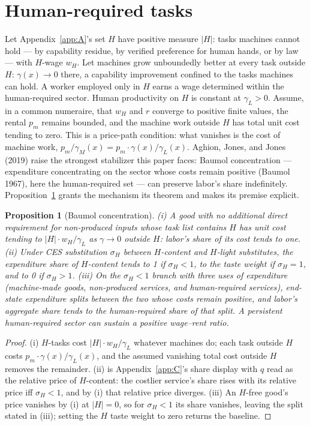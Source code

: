 \documentclass[12pt]{article}
\theoremstyle{plain}
\newtheorem{proposition}{Proposition}
\begin{document}
\section{Human-required tasks}\label{app:E}

Let Appendix~\ref{app:A}'s set $H$ have positive measure $|H|$: tasks machines cannot hold --- by capability residue, by verified preference for human hands, or by law --- with $H$-wage $w_H$. Let machines grow unboundedly better at every task outside $H$: $\gamma (x) \to 0$ there, a capability improvement confined to the tasks machines can hold. A worker employed only in $H$ earns a wage determined within the human-required sector. Human productivity on $H$ is constant at $\gamma_L>0$. Assume, in a common numeraire, that $w_H$ and $r$ converge to positive finite values, the rental $p_m$ remains bounded, and the machine work outside $H$ has total unit cost tending to zero. This is a price-path condition: what vanishes is the cost of machine work, $p_m/\gamma _M(x) = p_m\cdot \gamma (x)/\gamma _L(x)$. Aghion, Jones, and Jones (2019) raise the strongest stabilizer this paper faces: Baumol concentration --- expenditure concentrating on the sector whose costs remain positive (Baumol 1967), here the human-required set --- can preserve labor's share indefinitely. Proposition~\ref{prop:E.1} grants the mechanism its theorem and makes its premise explicit.

\begin{proposition}[Baumol concentration]\label{prop:E.1}
(i) A good with no additional direct requirement for non-produced inputs whose task list contains $H$ has unit cost tending to $|H|\cdot w_H/\gamma _L$ as $\gamma \to 0$ outside $H$: labor's share of its cost tends to one. (ii) Under CES substitution $\sigma _H$ between $H$-content and $H$-light substitutes, the expenditure share of $H$-content tends to 1 if $\sigma _H < 1$, to the taste weight if $\sigma _H = 1$, and to 0 if $\sigma _H > 1$. (iii) On the $\sigma _H < 1$ branch with three uses of expenditure (machine-made goods, non-produced services, and human-required services), end-state expenditure splits between the two whose costs remain positive, and labor's aggregate share tends to the human-required share of that split. A persistent human-required sector can sustain a positive wage--rent ratio.
\end{proposition}

\begin{proof}
(i) $H$-tasks cost $|H|\cdot w_H/\gamma _L$ whatever machines do; each task outside $H$ costs $p_m\cdot \gamma (x)/\gamma _L(x)$, and the assumed vanishing total cost outside $H$ removes the remainder. (ii) is Appendix~\ref{app:C}'s share display with $q$ read as the relative price of $H$-content: the costlier service's share rises with its relative price iff $\sigma _H < 1$, and by (i) that relative price diverges. (iii) An $H$-free good's price vanishes by (i) at $|H| = 0$, so for $\sigma _H < 1$ its share vanishes, leaving the split stated in (iii); setting the $H$ taste weight to zero returns the baseline.
\end{proof}
\end{document}
